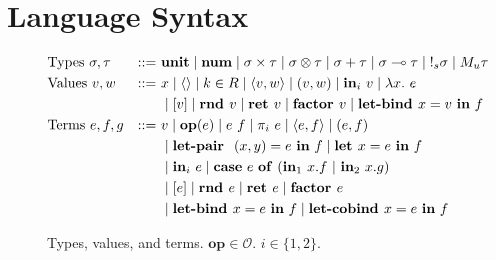\section{Language Syntax}

\begin{figure}[tbp]
  \begin{alignat*}{3}
         &\text{Types } \sigma, \tau &::=~ &\mathbf{unit}
         \mid \num
         \mid \sigma \times \tau 
         \mid \sigma \otimes \tau
         \mid \sigma + \tau 
         \mid \sigma \multimap \tau
         \mid {\bang{s} \sigma}
         \mid {M_u \tau}
         \\
         &\text{Values } v, w \ &::=~ &x
         \mid \langle \rangle
         \mid k \in R
         \mid \langle v,w \rangle 
         \mid (v, w)
         \mid \tin_i \ v
         \mid \lambda x.~e \\
         & & & \mid [v]
         \mid\rnd v
         \mid {\ret v} 
         \mid \factor v
         \mid \letbind x = v \ \tin \ f 
         \\
         &\text{Terms } e, f, g &::=~ & v
         \mid \mathbf{op}(e)
         \mid e~f
         \mid {\pi}_i\ e
         \mid \langle e,f \rangle 
         \mid (e, f) \\
         & & & \mid \letpair \ (x,y) = e \ \tin \ f
         \mid \letassign x  = e \ \tin \ f \\
         & & & \mid \tin_i \ e
         \mid 
          \mathbf{case} \ e \ \mathbf{of} \ (\tin_1 \ x.f \ | \ \tin_2 \ x.g) \\
         & & &
         \mid [e]
         \mid \rnd e
         \mid {\ret e} 
         \mid \factor e \\
         & & & 
         \mid {\letbind x = e \ \tin \ f}
         \mid \letcobind x = e \ \tin \ f
  \end{alignat*}
  \caption{
    Types, values, and terms. 
    $\mathbf{op} \in \mathcal{O}$.
    $i \in \{1, 2\}$. 
  }
  \label{fig:syntax}
\end{figure}


